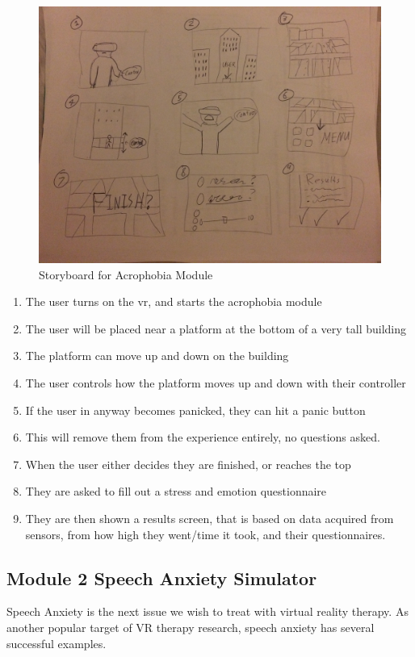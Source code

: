 \documentclass[a4paper,10pt]{article}
\begin{document}
\pagebreak
\begin{figure}[H] %
	\centerline {\includegraphics[scale = 0.13, angle = 180]{sbHeight.jpg}}
	\caption{Storyboard for Acrophobia Module}
	\label{fig:sbHeight}
\end{figure}
\begin{enumerate}
	\item The user turns on the vr, and starts the acrophobia module
	\item The user will be placed near a platform at the bottom of a very tall building
	\item The platform can move up and down on the building
	\item The user controls how the platform moves up and down with their controller
	\item If the user in anyway becomes panicked, they can hit a panic button
	\item This will remove them from the experience entirely, no questions asked.
	\item When the user either decides they are finished, or reaches the top
	\item They are asked to fill out a stress and emotion questionnaire
	\item They are then shown a results screen, that is based on data acquired from sensors, from how high they went/time it took, and their questionnaires.
\end{enumerate}
\pagebreak
\subsection{Module 2 Speech Anxiety Simulator}
Speech Anxiety is the next issue we wish to treat with virtual reality therapy. As another popular target of VR therapy research, speech anxiety has several successful examples.
\end{document}
